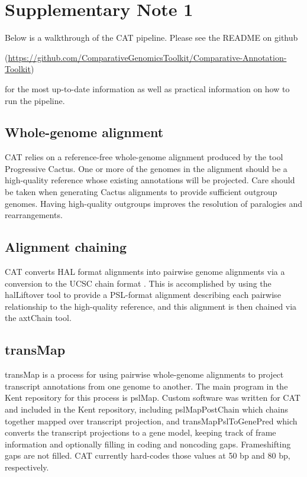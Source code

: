 \clearpage
\beginsupplement

\section*{Supplementary Note 1}

Below is a walkthrough of the CAT pipeline. Please see the README on github 

(\url{https://github.com/ComparativeGenomicsToolkit/Comparative-Annotation-Toolkit}) 

for the most up-to-date information as well as practical information on how to run the pipeline. 

\subsection*{Whole-genome alignment}
	CAT relies on a reference-free whole-genome alignment produced by the tool Progressive Cactus. One or more of the genomes in the alignment should be a high-quality reference whose existing annotations will be projected. Care should be taken when generating Cactus alignments to provide sufficient outgroup genomes. Having high-quality outgroups improves the resolution of paralogies and rearrangements.

\subsection*{Alignment chaining}
	CAT converts HAL format alignments into pairwise genome alignments via a conversion to the UCSC chain format  \citep{kent2003evolution}. This is accomplished by using the halLiftover tool to provide a PSL-format alignment describing each pairwise relationship to the high-quality reference, and this alignment is then chained via the axtChain tool. 
  
\subsection*{transMap}
	transMap  \citep{stanke2008using,zhu2007comparative} is a process for using pairwise whole-genome alignments to project transcript annotations from one genome to another. The main program in the Kent repository for this process is pslMap. Custom software was written for CAT and included in the Kent repository, including pslMapPostChain which chains together mapped over transcript projection, and transMapPslToGenePred which converts the transcript projections to a gene model, keeping track of frame information and optionally filling in coding and noncoding gaps. Frameshifting gaps are not filled. CAT currently hard-codes those values at 50 bp and 80 bp, respectively.
  
